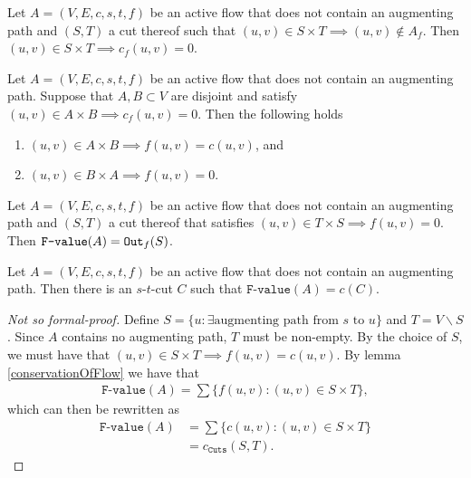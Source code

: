 \documentclass{article}
\begin{document}
\begin{lemma}
    Let $A=(V, E, c, s, t, f)$ be an active flow that does not contain an augmenting path and $(S, T)$ a cut thereof such that $(u, v) \in S \times T \implies (u, v) \not\in A_f$. Then $(u, v) \in S \times T \implies c_f(u, v) = 0$.
\end{lemma}

\begin{lemma}
    Let $A=(V, E, c, s, t, f)$ be an active flow that does not contain an augmenting path. Suppose that $A, B \subset V$ are disjoint and satisfy $(u, v) \in A \times B \implies c_f(u, v)=0$. Then the following holds
    \begin{enumerate}[label = (\alph*)]
        \item $(u, v) \in A \times B \implies f(u, v)=c(u, v)$, and
        \item $(u, v) \in B \times A \implies f(u, v) = 0$.
    \end{enumerate}
\end{lemma}

\begin{lemma}
    Let $A=(V, E, c, s, t, f)$ be an active flow that does not contain an augmenting path and $(S, T)$ a cut thereof that satisfies $(u, v) \in T \times S \implies f(u, v)=0$. Then $\texttt{F-value}(A) = \texttt{Out}_{f}(S)$.
\end{lemma}

\begin{superlemma}\label{superlemma3}
    Let $A=(V, E, c, s, t, f)$ be an active flow that does not contain an augmenting path. Then there is an $s$-$t$-cut $C$ such that $\texttt{F-value}(A)=c(C)$.
\end{superlemma}
\begin{proof}[Not so formal-proof]
    Define $S=\{u: \exists \text{augmenting path from $s$ to $u$}\}$ and $T=V \backslash S$. Since $A$ contains no augmenting path, $T$ must be non-empty. By the choice of $S$, we must have that $(u, v) \in S \times T \implies f(u, v)=c(u, v)$. By lemma \ref{conservationOfFlow} we have that
    \begin{align*}
        \texttt{F-value}(A)=\sum \{f(u, v): (u, v) \in S \times T\},
    \end{align*}
    which can then be rewritten as
    \begin{align*}
        \texttt{F-value}(A) &= \sum \{c(u, v): (u, v) \in S \times T\}\\
        &= c_{\texttt{Cuts}}(S, T).
    \end{align*}
    \end{proof}
\end{document}
